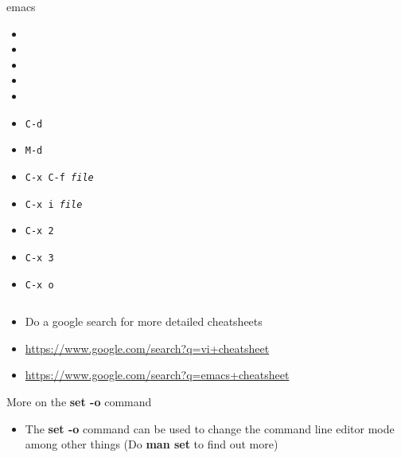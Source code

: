 \documentclass[10pt,t]{beamer}
\begin{document}
\begin{frame}[allowframebreaks]
{\begin{columns}
\begin{exampleblock}{emacs}
    \begin{itemize}
      \item 
      \item 
      \item 
      \item
      \item
      \item \texttt{C-d}
      \item \texttt{M-d}
      \item \texttt{C-x C-f \textit{file}}
      \item \texttt{C-x i \textit{file}}
      \item \texttt{C-x 2}
      \item \texttt{C-x 3}
      \item \texttt{C-x o}
    \end{itemize}
    \end{exampleblock}
  \end{columns}
  }
  \framebreak
  \begin{itemize}
    \item Do a google search for more detailed cheatsheets
    \item[\texttt{vi}] \url{https://www.google.com/search?q=vi+cheatsheet}
    \item[\texttt{emacs}] \url{https://www.google.com/search?q=emacs+cheatsheet}
  \end{itemize}
  \begin{block}{More on the \textbf{set -o} command}
    \begin{itemize}
      \item The \textbf{\color{lubrown}set -o} command can be used to change the command line editor mode among other things (Do \textbf{\color{lubrown}man set\Enter} to find out more)
    \end{itemize}
  \end{block}
\end{frame}
\end{document}
